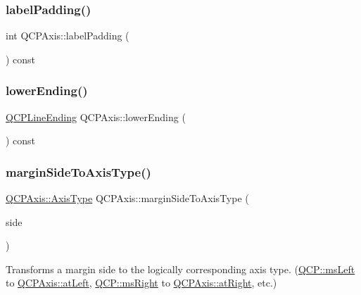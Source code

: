 \mbox{\label{class_q_c_p_axis_a6d9a9fe1c7166f209fb1e25686390451}} 
\subsubsection{\texorpdfstring{labelPadding()}{labelPadding()}}
{\footnotesize\ttfamily int Q\+C\+P\+Axis\+::label\+Padding (\begin{DoxyParamCaption}{ }\end{DoxyParamCaption}) const}

\mbox{\label{class_q_c_p_axis_a0cc60e5694ed4df6a2c3554e53ee6ae7}} 
\subsubsection{\texorpdfstring{lowerEnding()}{lowerEnding()}}
{\footnotesize\ttfamily \mbox{\hyperlink{class_q_c_p_line_ending}{Q\+C\+P\+Line\+Ending}} Q\+C\+P\+Axis\+::lower\+Ending (\begin{DoxyParamCaption}{ }\end{DoxyParamCaption}) const}

\mbox{\label{class_q_c_p_axis_ac0a6b77bd52bec6c81cd62d167cfeba6}} 
\subsubsection{\texorpdfstring{marginSideToAxisType()}{marginSideToAxisType()}}
{\footnotesize\ttfamily \mbox{\hyperlink{class_q_c_p_axis_ae2bcc1728b382f10f064612b368bc18a}{Q\+C\+P\+Axis\+::\+Axis\+Type}} Q\+C\+P\+Axis\+::margin\+Side\+To\+Axis\+Type (\begin{DoxyParamCaption}\item[{\mbox{\hyperlink{namespace_q_c_p_a7e487e3e2ccb62ab7771065bab7cae54}{Q\+C\+P\+::\+Margin\+Side}}}]{side }\end{DoxyParamCaption})\hspace{0.3cm}{\ttfamily [static]}}

Transforms a margin side to the logically corresponding axis type. (\mbox{\hyperlink{namespace_q_c_p_a7e487e3e2ccb62ab7771065bab7cae54a9500c8bfcc9e80b9dff0a8e00e867f07}{Q\+C\+P\+::ms\+Left}} to \mbox{\hyperlink{class_q_c_p_axis_ae2bcc1728b382f10f064612b368bc18aaf84aa6cac6fb6099f54a2cbf7546b730}{Q\+C\+P\+Axis\+::at\+Left}}, \mbox{\hyperlink{namespace_q_c_p_a7e487e3e2ccb62ab7771065bab7cae54a93c719593bb2b94ed244d52c86d83b65}{Q\+C\+P\+::ms\+Right}} to \mbox{\hyperlink{class_q_c_p_axis_ae2bcc1728b382f10f064612b368bc18aadf5509f7d29199ef2f263b1dd224b345}{Q\+C\+P\+Axis\+::at\+Right}}, etc.) \mbox{\label{class_q_c_p_axis_ac5a269609e6177737faabdc46434d8c7}} 

